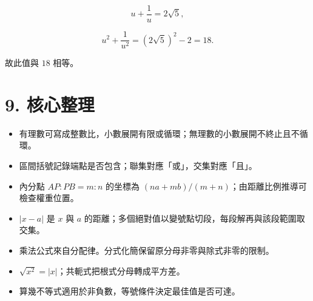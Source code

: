 \documentclass[11pt,a4paper]{article}
\providecommand{\tightlist}{%
  \setlength{\itemsep}{0pt}\setlength{\parskip}{0pt}}
\begin{document}
\[
u+\frac1u=2\sqrt5,
\]

\[
u^2+\frac1{u^2}=\left(2\sqrt5\right)^2-2=\boxed{18}.
\]

故此值與 \(18\) 相等。

\section{9. 核心整理}\label{ux6838ux5fc3ux6574ux7406}

\begin{itemize}
\tightlist
\item
  有理數可寫成整數比，小數展開有限或循環；無理數的小數展開不終止且不循環。
\item
  區間括號記錄端點是否包含；聯集對應「或」，交集對應「且」。
\item
  內分點 \(AP:PB=m:n\) 的坐標為 \((na+mb)/(m+n)\)；由距離比例推導可檢查權重位置。
\item
  \(|x-a|\) 是 \(x\) 與 \(a\) 的距離；多個絕對值以變號點切段，每段解再與該段範圍取交集。
\item
  乘法公式來自分配律。分式化簡保留原分母非零與除式非零的限制。
\item
  \(\sqrt{x^2}=|x|\)；共軛式把根式分母轉成平方差。
\item
  算幾不等式適用於非負數，等號條件決定最佳值是否可達。
\end{itemize}
\end{document}
